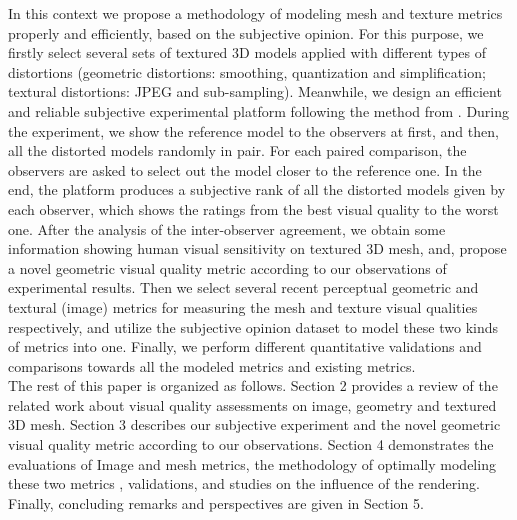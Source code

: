 In this context we propose a methodology of modeling mesh and texture metrics properly and efficiently, based on the subjective opinion. For this purpose, we firstly select several sets of textured 3D models applied with different types of distortions (geometric distortions: smoothing, quantization and simplification; textural distortions: JPEG and sub-sampling). Meanwhile, we design an efficient and reliable subjective experimental platform following the method from \cite{Farrell_2001}. During the experiment, we show the reference model to the observers at first, and then, all the distorted models randomly in pair. For each paired comparison, the observers are asked to select out the model closer to the reference one. In the end, the platform produces a subjective rank of all the distorted models given by each observer, which shows the ratings from the best visual quality to the worst one. After the analysis of the inter-observer agreement, we obtain some information showing human visual sensitivity on textured 3D mesh, and, propose a novel geometric visual quality metric according to our observations of experimental results. Then we select several recent perceptual geometric and textural (image) metrics for measuring the mesh and texture visual qualities respectively, and utilize the subjective opinion dataset to model these two kinds of metrics into one. Finally, we perform different quantitative validations and comparisons towards all the modeled metrics and existing metrics.\\
The rest of this paper is organized as follows. Section 2 provides a review of the related work about visual quality assessments on image, geometry and textured 3D mesh.  Section 3 describes our subjective experiment and the novel geometric visual quality metric according to our observations.
Section 4 demonstrates the evaluations of Image and mesh metrics, the methodology of optimally modeling these two  metrics , validations, and studies on the influence of the rendering. Finally, concluding remarks and perspectives are given in Section 5.